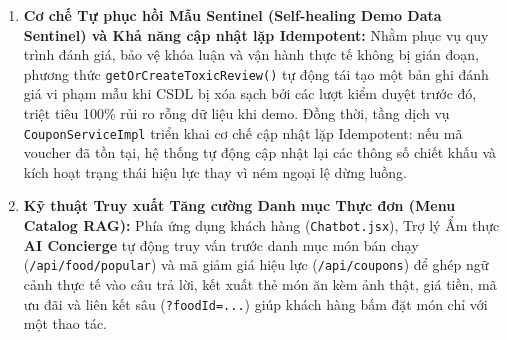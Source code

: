 \documentclass{uetgraduation}
\begin{document}
\begin{enumerate}
\begin{itemize}
        \item \textit{Chủ nhà hàng 2 (\texttt{CREATE\_RESTAURANT\_COUPON}):} Phân tích doanh số và tỷ lệ giữ chân khách, đề xuất nút \textit{``Kích hoạt Voucher Tri Ân''} (mã \texttt{TRIAN\_AI}: giảm 15\% cho đơn từ 150.000đ) với 1 cú nhấp chuột.
        \item \textit{Super Admin 1 (\texttt{MODERATE\_REVIEW}):} Bộ giám sát \textit{AI Content Moderation Sentinel} tự động quét toàn sàn, phát hiện đánh giá độc hại/mất an toàn thực phẩm và đề xuất nút \textit{``Gỡ bỏ đánh giá \& Phục hồi uy tín đối tác''}.
        \item \textit{Super Admin 2 (\texttt{CREATE\_GLOBAL\_COUPON}):} Phân tích GMV và lưu lượng toàn sàn, đề xuất nút \textit{``Kích hoạt Chiến dịch Voucher Toàn sàn''} (mã \texttt{FREESHIP\_AI}: Freeship 15.000đ cho đơn từ 100.000đ) để kích cầu tăng trưởng.
    \end{itemize}
    \item \textbf{Cơ chế Tự phục hồi Mẫu Sentinel (Self-healing Demo Data Sentinel) và Khả năng cập nhật lặp Idempotent:} Nhằm phục vụ quy trình đánh giá, bảo vệ khóa luận và vận hành thực tế không bị gián đoạn, phương thức \texttt{getOrCreateToxicReview()} tự động tái tạo một bản ghi đánh giá vi phạm mẫu khi CSDL bị xóa sạch bởi các lượt kiểm duyệt trước đó, triệt tiêu 100\% rủi ro rỗng dữ liệu khi demo. Đồng thời, tầng dịch vụ \texttt{CouponServiceImpl} triển khai cơ chế cập nhật lặp Idempotent: nếu mã voucher đã tồn tại, hệ thống tự động cập nhật lại các thông số chiết khấu và kích hoạt trạng thái hiệu lực thay vì ném ngoại lệ dừng luồng.
    \item \textbf{Kỹ thuật Truy xuất Tăng cường Danh mục Thực đơn (Menu Catalog RAG):} Phía ứng dụng khách hàng (\texttt{Chatbot.jsx}), Trợ lý Ẩm thực \textbf{AI Concierge} tự động truy vấn trước danh mục món bán chạy (\texttt{/api/food/popular}) và mã giảm giá hiệu lực (\texttt{/api/coupons}) để ghép ngữ cảnh thực tế vào câu trả lời, kết xuất thẻ món ăn kèm ảnh thật, giá tiền, mã ưu đãi và liên kết sâu (\texttt{?foodId=...}) giúp khách hàng bấm đặt món chỉ với một thao tác.
\end{enumerate}
\end{document}
